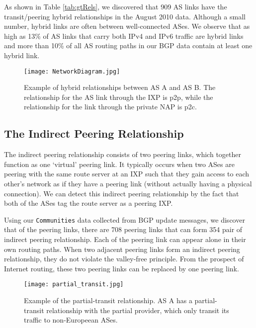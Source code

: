 \documentclass[conference]{IEEEtran}
\begin{document}
As shown in Table \ref{tab:gtRels}, we discovered that 909 AS links have the transit/peering hybrid relationships in the August 2010 data.
Although a small number, hybrid links are often between well-connected ASes.
We observe that  as high as 13\% of AS links that carry both IPv4 and IPv6 traffic are hybrid links
and more than 10\% of all AS routing paths in our BGP data contain at least one hybrid link. 



\begin{figure}[t]
	\centering
		\texttt{[image: NetworkDiagram.jpg]}
	\caption{Example of hybrid relationships  between AS A and AS B. The relationship for the AS link through the IXP is p2p, while the relationship for the link through the private NAP is p2c.  }
	\label{fig:hybridRel}
\end{figure}

\subsection{The Indirect Peering Relationship} 

The indirect peering relationship consists of two peering links, which together function as one `virtual' peering link.
It typically occurs when two ASes are peering with the same route server at an IXP such that they gain access to each other's network  as if they have a peering link (without actually having a  physical connection). 
We can detect this indirect peering relationship by the fact that both of the ASes tag the route server as a peering IXP.


Using our {\tt Communities} data collected from BGP update messages, we discover that of the peering links, there are 708 peering links that can form 354 pair of indirect peering relationship. 
Each of the peering link can appear alone in their own routing paths. When two adjacent  peering links form an indirect peering relationship, they do not violate the valley-free principle. From the prospect of Internet  routing, these two peering links can  be replaced by one peering link. 

\begin{figure}
	\centering
		\texttt{[image: partial\_transit.jpg]}
	\label{fig:partial_transit}
	\caption{Example of the partial-transit relationship. AS A has a partial-transit relationship with the partial provider, which only transit its traffic to non-Europeean ASes. }
	\label{fig:partialRel}
\end{figure}
\end{document}
